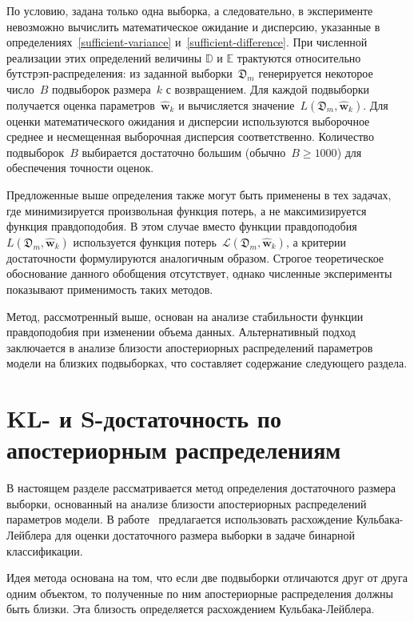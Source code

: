По условию, задана только одна выборка, а следовательно, в эксперименте невозможно вычислить математическое ожидание и дисперсию, указанные в определениях~\ref{sufficient-variance} и~\ref{sufficient-difference}.
При численной реализации этих определений величины $\mathbb{D}$ и $\mathbb{E}$ трактуются относительно бутстрэп-распределения: из заданной выборки~$\mathfrak{D}_m$ генерируется некоторое число~$B$ подвыборок размера~$k$ с возвращением.
Для каждой подвыборки получается оценка параметров~$\hat{\mathbf{w}}_{k}$ и вычисляется значение~$L(\mathfrak{D}_m, \hat{\mathbf{w}}_{k})$.
Для оценки математического ожидания и дисперсии используются выборочное среднее и несмещенная выборочная дисперсия соответственно. Количество подвыборок~$B$ выбирается достаточно большим (обычно~$B \geqslant 1000$) для обеспечения точности оценок.

Предложенные выше определения также могут быть применены в тех задачах, где минимизируется произвольная функция потерь, а не максимизируется функция правдоподобия. В этом случае вместо функции правдоподобия~$L(\mathfrak{D}_m, \hat{\mathbf{w}}_{k})$ используется функция потерь~$\mathcal{L}(\mathfrak{D}_m, \hat{\mathbf{w}}_{k})$, а критерии достаточности формулируются аналогичным образом.
Строгое теоретическое обоснование данного обобщения отсутствует, однако численные эксперименты показывают применимость таких методов.

Метод, рассмотренный выше, основан на анализе стабильности функции правдоподобия при изменении объема данных. Альтернативный подход заключается в анализе близости апостериорных распределений параметров модели на близких подвыборках, что составляет содержание следующего раздела.

\section{KL- и S-достаточность по апостериорным распределениям}

В настоящем разделе рассматривается метод определения достаточного размера выборки, основанный на анализе близости апостериорных распределений параметров модели. В работе~\cite{motrenko2014} предлагается использовать расхождение Кульбака-Лейблера для оценки достаточного размера выборки в задаче бинарной классификации.

Идея метода основана на том, что если две подвыборки отличаются друг от друга одним объектом, то полученные по ним апостериорные распределения должны быть близки. Эта близость определяется расхождением Кульбака-Лейблера.

